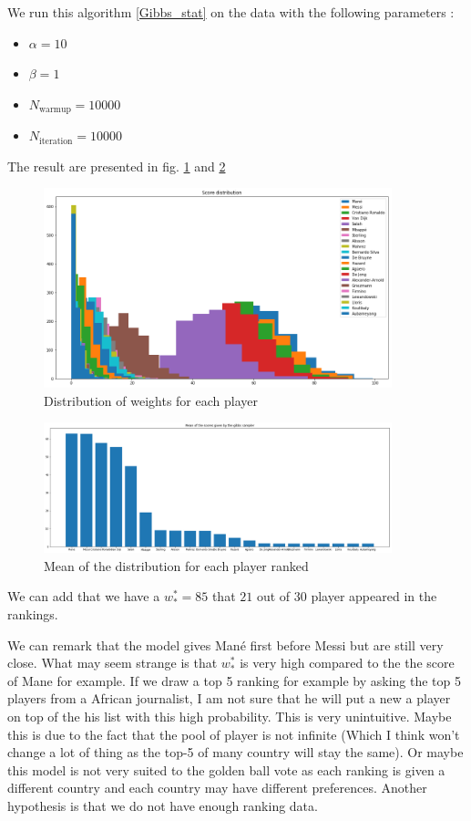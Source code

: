 \documentclass{article}
\begin{document}
We run this algorithm \ref{Gibbs_stat} on the data with the following parameters : 
\begin{itemize}
    \item $\alpha =10 $
    \item $\beta =1$
    \item $N_\text{warmup} = 10000$
    \item $N_\text{iteration} = 10000$
\end{itemize}
The result are presented in fig. \ref{fig:disrib_weight} and \ref{fig:mean_weight} 

\begin{figure}
    \centering
    \includegraphics[width = 0.9\textwidth]{Distrib_player.png}
    \caption{Distribution of weights for each player}
    \label{fig:disrib_weight}
\end{figure}

\begin{figure}
    \centering
    \includegraphics[width = 0.9\textwidth]{mean_score_player.png}
    \caption{Mean of the distribution for each player ranked}
    \label{fig:mean_weight}
\end{figure}
We can add that we have a $w^*_* = 85 $ that $21$ out of $30$ player appeared in the rankings.

We can remark that the model gives Mané first before Messi but are still very close. What may seem strange is that $w^*_*$ is very high compared to the the score of Mane for example. If we draw a top 5 ranking for example by asking the top 5 players from a African journalist, I am not sure that he will put a new a player on top of the his list with this high probability. This is very unintuitive. Maybe this is due to the fact that the pool of player is not infinite (Which I think won't change a lot of thing as the top-5 of many country will stay the same). Or maybe this model is not very suited to the golden ball vote as each ranking is given a different country and each country may have different preferences.
Another hypothesis is that we do not have enough ranking data. 
\end{document}
